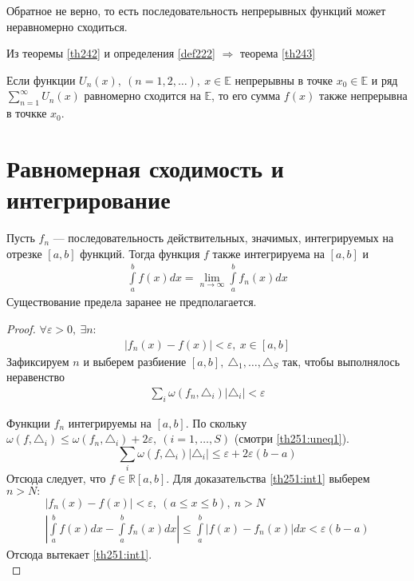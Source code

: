 \begin{remark}
  Обратное не верно, то есть последовательность непрерывных функций может
  неравномерно сходиться.
\end{remark}

Из теоремы \eqref{th242} и определения \eqref{def222} $\Rightarrow$ теорема \eqref{th243}

\begin{theorem}
  \label{th243}
  Если функции $U_n(x), \ (n = 1, 2, \dots), \ x \in \mathbb{E}$ непрерывны
  в точке $x_0 \in \mathbb{E}$ и ряд $\sum\limits_{n = 1}^{\infty} U_n(x)$
  равномерно сходится на $\mathbb{E}$, то его сумма $f(x)$ также непрерывна
  в точкке $x_0$.
\end{theorem}

\section{Равномерная сходимость и интегрирование}
\begin{theorem}
  \label{th251}
  Пусть $f_n$ --- последовательность действительных, значимых, интегрируемых на
  отрезке $[a, b]$ функций. Тогда функция $f$ также интегрируема на $[a,b]$ и
  \begin{gather}
    \int\limits_a^b f(x) dx = \lim\limits_{n \to \infty} \int\limits_a^b f_n(x) dx
    \label{th251:int1}
  \end{gather}
  Существование предела заранее не предполагается.
\end{theorem}

\begin{proof}
  $\forall \varepsilon > 0, \ \exists n:$
  \begin{gather}
    |f_n(x) - f(x)| < \varepsilon, \ x \in [a,b] \label{th251:uneq1}
  \end{gather}
  Зафиксируем $n$ и выберем разбиение
  $[a,b], \ \triangle_1, \dots, \triangle_S$ так, чтобы выполнялось неравенство
  \begin{gather}
    \sum_i \omega(f_n, \triangle_i) |\triangle_i| < \varepsilon \label{th251:sum1}
  \end{gather}
  \begin{comment}
    $\omega(f, E) = \sup - \inf$ --- колебание функции.
  \end{comment}
  Функции $f_n$ интегрируемы на $[a,b]$. По скольку
  $\omega(f, \triangle_i) \leq \omega(f_n, \triangle_i) + 2 \varepsilon,  \ (i = 1, \dots, S)$
  (смотри \eqref{th251:uneq1}).
  $$\sum_i \omega(f, \triangle_i)|\triangle_i| \leq \varepsilon + 2\varepsilon (b - a)$$
  Отсюда следует, что $f \in \mathbb{R} [a,b]$. Для доказательства \eqref{th251:int1}
  выберем $n > N: $
  \begin{gather*}
    |f_n(x) - f(x)| < \varepsilon, \ (a \leq x \leq b), \ n > N \\
    \left|\int\limits_a^b f(x) dx - \int\limits_a^b f_n(x) dx\right| \leq
    \int\limits_a^b |f(x) - f_n(x)| dx < \varepsilon(b - a)
  \end{gather*}
  Отсюда вытекает \eqref{th251:int1}. \\
\end{proof}

